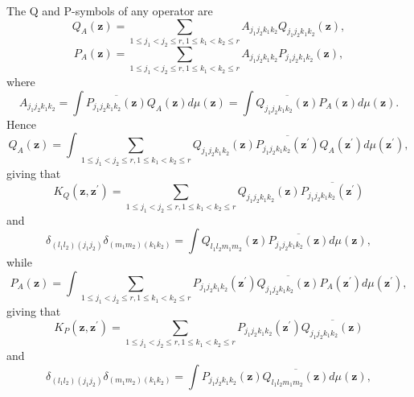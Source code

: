 \documentclass[aps,preprint]{revtex4}%
\begin{document}
The Q and P-symbols of any operator are
\begin{equation}
Q_{A}\left(  \mathbf{z}\right)  =\sum_{1\leq j_{1}<j_{2}\leq r,1\leq
k_{1}<k_{2}\leq r}A_{j_{1}j_{2}k_{1}k_{2}}Q_{j_{1}j_{2}k_{1}k_{2}}\left(
\mathbf{z}\right)  ,
\end{equation}%
\begin{equation}
P_{A}\left(  \mathbf{z}\right)  =\sum_{1\leq j_{1}<j_{2}\leq r,1\leq
k_{1}<k_{2}\leq r}A_{j_{1}j_{2}k_{1}k_{2}}P_{j_{1}j_{2}k_{1}k_{2}}\left(
\mathbf{z}\right)  ,
\end{equation}
where
\begin{equation}
A_{j_{1}j_{2}k_{1}k_{2}}=\int\overline{P_{j_{1}j_{2}k_{1}k_{2}}\left(
\mathbf{z}\right)  }Q_{A}\left(  \mathbf{z}\right)  d\mu\left(  \mathbf{z}%
\right)  =\int\overline{Q_{j_{1}j_{2}k_{1}k_{2}}\left(  \mathbf{z}\right)
}P_{A}\left(  \mathbf{z}\right)  d\mu\left(  \mathbf{z}\right)  .
\end{equation}
Hence
\begin{equation}
Q_{A}\left(  \mathbf{z}\right)  =\int\sum_{1\leq j_{1}<j_{2}\leq r,1\leq
k_{1}<k_{2}\leq r}Q_{j_{1}j_{2}k_{1}k_{2}}\left(  \mathbf{z}\right)
\overline{P_{j_{1}j_{2}k_{1}k_{2}}\left(  \mathbf{z}^{\prime}\right)  }%
Q_{A}\left(  \mathbf{z}^{\prime}\right)  d\mu\left(  \mathbf{z}^{\prime
}\right)  ,
\end{equation}
giving that
\begin{equation}
K_{Q}\left(  \mathbf{z,z}^{\prime}\right)  =\sum_{1\leq j_{1}<j_{2}\leq
r,1\leq k_{1}<k_{2}\leq r}Q_{j_{1}j_{2}k_{1}k_{2}}\left(  \mathbf{z}\right)
\overline{P_{j_{1}j_{2}k_{1}k_{2}}\left(  \mathbf{z}^{\prime}\right)  }%
\end{equation}
and
\begin{equation}
\delta_{\left(  l_{1}l_{2}\right)  \left(  j_{1}j_{2}\right)  }\delta_{\left(
m_{1}m_{2}\right)  \left(  k_{1}k_{2}\right)  }=\int Q_{l_{1}l_{2}m_{1}m_{2}%
}\left(  \mathbf{z}\right)  \overline{P_{j_{1}j_{2}k_{1}k_{2}}\left(
\mathbf{z}\right)  }d\mu\left(  \mathbf{z}\right)  ,
\end{equation}
while
\begin{equation}
P_{A}\left(  \mathbf{z}\right)  =\int\sum_{1\leq j_{1}<j_{2}\leq r,1\leq
k_{1}<k_{2}\leq r}P_{j_{1}j_{2}k_{1}k_{2}}\left(  \mathbf{z}^{\prime}\right)
\overline{Q_{j_{1}j_{2}k_{1}k_{2}}\left(  \mathbf{z}\right)  }P_{A}\left(
\mathbf{z}^{\prime}\right)  d\mu\left(  \mathbf{z}^{\prime}\right)  ,
\end{equation}
giving that
\begin{equation}
K_{P}\left(  \mathbf{z,z}^{\prime}\right)  =\sum_{1\leq j_{1}<j_{2}\leq
r,1\leq k_{1}<k_{2}\leq r}P_{j_{1}j_{2}k_{1}k_{2}}\left(  \mathbf{z}^{\prime
}\right)  \overline{Q_{j_{1}j_{2}k_{1}k_{2}}\left(  \mathbf{z}\right)  }%
\end{equation}
and
\begin{equation}
\delta_{\left(  l_{1}l_{2}\right)  \left(  j_{1}j_{2}\right)  }\delta_{\left(
m_{1}m_{2}\right)  \left(  k_{1}k_{2}\right)  }=\int P_{j_{1}j_{2}k_{1}k_{2}%
}\left(  \mathbf{z}\right)  \overline{Q_{l_{1}l_{2}m_{1}m_{2}}\left(
\mathbf{z}\right)  }d\mu\left(  \mathbf{z}\right)  ,
\end{equation}
\end{document}
